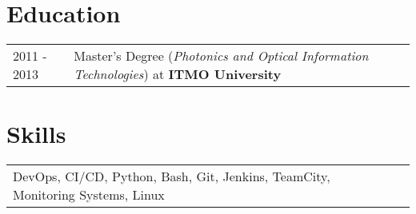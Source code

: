 \documentclass[a4paper,12pt]{article}
\begin{document}
\section{Education}
\begin{tabularx}{\linewidth}{@{}l X@{}}	
2011 - 2013 & {Master’s Degree (\textit{Photonics and Optical Information Technologies})} at  \textbf{ITMO University} \\

\end{tabularx}

\section{Skills}
\begin{tabularx}{\linewidth}{@{}l X@{}}
\begin{minipage}[t]{\linewidth}
\normalsize{DevOps, CI/CD, Python, Bash, Git, Jenkins, TeamCity, Monitoring Systems, Linux}
\end{minipage}
\end{tabularx}

\vfill
{}
\end{document}
